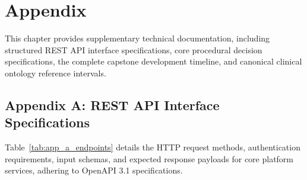 \chapter{Appendix}
\label{chap:appendix}

This chapter provides supplementary technical documentation, including structured REST API interface specifications, core procedural decision specifications, the complete capstone development timeline, and canonical clinical ontology reference intervals.

\section{Appendix A: REST API Interface Specifications}
\label{sec:app_api_payloads}

Table~\ref{tab:app_a_endpoints} details the HTTP request methods, authentication requirements, input schemas, and expected response payloads for core platform services, adhering to OpenAPI 3.1 specifications.

